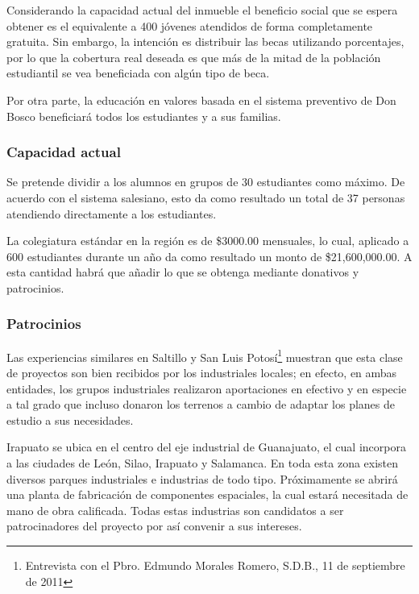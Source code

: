 Considerando la capacidad actual del inmueble el beneficio social que se espera obtener es el equivalente a 400 jóvenes atendidos de forma completamente gratuita. Sin embargo, la intención es distribuir las becas utilizando porcentajes, por lo que la cobertura real deseada es que más de la mitad de la población estudiantil se vea beneficiada con algún tipo de beca.

Por otra parte, la educación en valores basada en el sistema preventivo de Don Bosco beneficiará todos los estudiantes y a sus familias.

\subsubsection{Capacidad actual}

Se pretende dividir a los alumnos en grupos de 30 estudiantes como máximo. De acuerdo con el sistema salesiano, esto da como resultado un total de 37 personas atendiendo directamente a los estudiantes.

La colegiatura estándar en la región es de \$3000.00 mensuales, lo cual, aplicado a 600 estudiantes durante un año da como resultado un monto de \$21,600,000.00. A esta cantidad habrá que añadir lo que se obtenga mediante donativos y patrocinios.

\subsubsection{Patrocinios}
\label{sub:Patrocinios}

Las experiencias similares en Saltillo y San Luis Potosí\footnote{Entrevista con el Pbro. Edmundo Morales Romero, S.D.B., 11 de septiembre de 2011} muestran que esta clase de proyectos son bien recibidos por los industriales locales; en efecto, en ambas entidades, los grupos industriales realizaron aportaciones en efectivo y en especie a tal grado que incluso donaron los terrenos a cambio de adaptar los planes de estudio a sus necesidades.

Irapuato se ubica en el centro del eje industrial de Guanajuato, el cual incorpora a las ciudades de León, Silao, Irapuato y Salamanca. En toda esta zona existen diversos parques industriales e industrias de todo tipo. Próximamente se abrirá una planta de fabricación de componentes espaciales, la cual estará necesitada de mano de obra calificada. Todas estas industrias son candidatos a ser patrocinadores del proyecto por así convenir a sus intereses.
